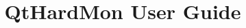 \documentclass{report}
\begin{document}
\title{QtHardMon User Guide}
\maketitle
\tableofcontents

\end{document}
